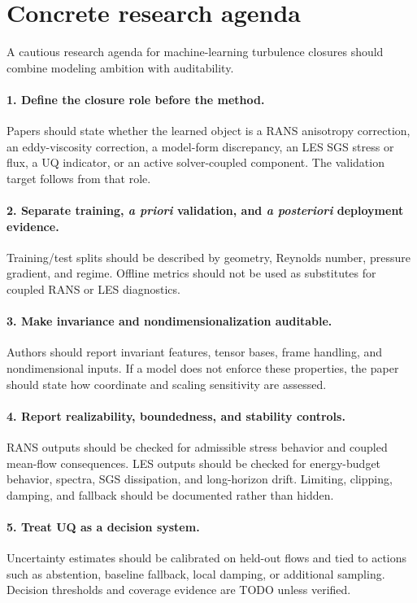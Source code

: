 \documentclass[11pt]{article}
\newcommand{\apriori}{\textit{a priori}}
\newcommand{\aposteriori}{\textit{a posteriori}}
\begin{document}
\section{Concrete research agenda}

A cautious research agenda for machine-learning turbulence closures should combine modeling ambition with auditability.

\paragraph{1. Define the closure role before the method.}
Papers should state whether the learned object is a RANS anisotropy correction, an eddy-viscosity correction, a model-form discrepancy, an LES SGS stress or flux, a UQ indicator, or an active solver-coupled component. The validation target follows from that role.

\paragraph{2. Separate training, \apriori{} validation, and \aposteriori{} deployment evidence.}
Training/test splits should be described by geometry, Reynolds number, pressure gradient, and regime. Offline metrics should not be used as substitutes for coupled RANS or LES diagnostics.

\paragraph{3. Make invariance and nondimensionalization auditable.}
Authors should report invariant features, tensor bases, frame handling, and nondimensional inputs. If a model does not enforce these properties, the paper should state how coordinate and scaling sensitivity are assessed.

\paragraph{4. Report realizability, boundedness, and stability controls.}
RANS outputs should be checked for admissible stress behavior and coupled mean-flow consequences. LES outputs should be checked for energy-budget behavior, spectra, SGS dissipation, and long-horizon drift. Limiting, clipping, damping, and fallback should be documented rather than hidden.

\paragraph{5. Treat UQ as a decision system.}
Uncertainty estimates should be calibrated on held-out flows and tied to actions such as abstention, baseline fallback, local damping, or additional sampling. Decision thresholds and coverage evidence are TODO unless verified.
\end{document}
